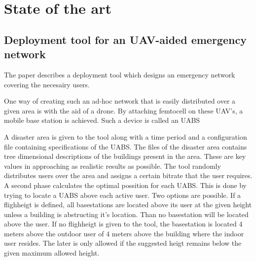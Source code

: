 \chapter{State of the art}
\label{chap:stateoftheart}

\section{Deployment tool for an UAV-aided emergency network}
\label{chap:stateoftheart:deploymenttool}


The paper \cite{J2} describes a deployment tool which designs an emergency network covering the necesairy users. 

One way of creating such an ad-hoc network that is easily distributed over a given area is with the aid of a drone.
By attaching femtocell on these UAV's, a mobile base station is achieved. Such a device is called an \gls{UABS}


A disaster area is given to the tool along with a time period and a configuration file containing specifications of the \gls{UABS}. The files of the disaster area contains tree dimensional 
descriptions of the buildings present in the area. These are key values in approaching as realistic results as possible. The tool randomly distributes users over the area and assigns a certain bitrate that 
the user requires. \\

A second phase calculates the optimal possition for each \gls{UABS}. This is done by trying to locate a \gls{UABS} above each active user. Two options are possible.
If a flighheigt is defined, all basestations are located above its user at the given height unless a building is abstructing it's location. Than no basestation will be located above the user.
If no flighheigt is given to the tool, the basestation is located 4 meters above the outdoor user of 4 meters above the building where the indoor user resides. 
The later is only allowed if the suggested heigt remains below the given maximum allowed height. \\

